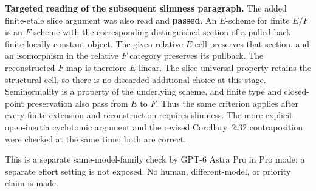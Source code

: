\medskip\noindent\textbf{Targeted reading of the subsequent slimness paragraph.}
The added finite-etale slice argument was also read and
\textbf{passed}.  An $E$-scheme for finite $E/F$ is an
$F$-scheme with the corresponding distinguished section
of a pulled-back finite locally constant object.  The
given relative $E$-cell preserves that section, and an
isomorphism in the relative $F$ category preserves its
pullback.  The reconstructed $F$-map is therefore
$E$-linear.  The slice universal property retains the
structural cell, so there is no discarded additional
choice at this stage.  Seminormality is a property of
the underlying scheme, and finite type and closed-point
preservation also pass from $E$ to $F$.  Thus the same
criterion applies after every finite extension and
reconstruction requires slimness.  The more explicit
open-inertia cyclotomic argument and the revised
Corollary~2.32 contraposition were checked at the same
time; both are correct.

This is a separate same-model-family check by
GPT-6 Astra Pro in Pro mode; a separate effort
setting is not exposed.  No human, different-model,
or priority claim is made.
